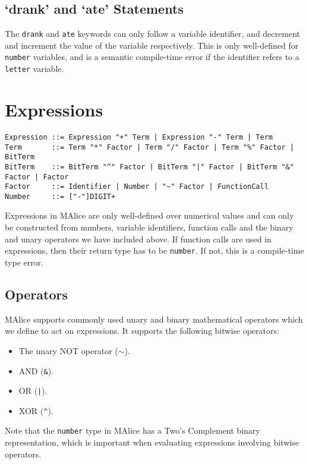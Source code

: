 \documentclass[a4wide, 11pt]{article}
\begin{document}
\subsection{`drank' and `ate' Statements}

The \texttt{drank} and \texttt{ate} keywords can only follow a variable identifier, and decrement and increment the value of the variable respectively. This is only well-defined for \texttt{number} variables, and is a semantic compile-time error if the identifier refers to a \texttt{letter} variable.
  
\section{Expressions}

\begin{verbatim}
Expression ::= Expression "+" Term | Expression "-" Term | Term
Term       ::= Term "*" Factor | Term "/" Factor | Term "%" Factor | BitTerm
BitTerm    ::= BitTerm "^" Factor | BitTerm "|" Factor | BitTerm "&" Factor | Factor
Factor     ::= Identifier | Number | "~" Factor | FunctionCall
Number     ::= ["-"]DIGIT+ 
\end{verbatim}

Expressions in MAlice are only well-defined over numerical values and can only be constructed from numbers, variable identifiers, function calls and the binary and unary operators we have included above. If function calls are used in expressions, then their return type has to be \texttt{number}. If not, this is a compile-time type error.

\subsection{Operators}

MAlice supports commonly used unary and binary mathematical operators which we define to act on expressions. It supports the following bitwise operators:

\begin{itemize}

\item The unary NOT operator ($\sim$).
\item AND (\texttt{\&}).
\item OR (\texttt{|}).
\item XOR (\texttt{\^}).

\end{itemize}

Note that the \texttt{number} type in MAlice has a Two's Complement binary representation, which is important when evaluating expressions involving bitwise operators.
\end{document}
